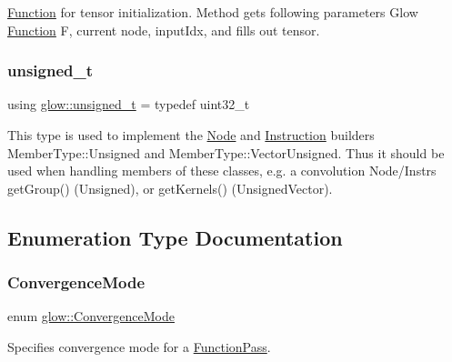 \hyperlink{classglow_1_1_function}{Function} for {\ttfamily tensor} initialization. Method gets following parameters Glow \hyperlink{classglow_1_1_function}{Function} {\ttfamily F}, current {\ttfamily node}, {\ttfamily input\+Idx}, and fills out {\ttfamily tensor}. \mbox{\label{namespaceglow_a0ca574644e1e42ef193a9947fb4d8911}} 
\subsubsection{\texorpdfstring{unsigned\+\_\+t}{unsigned\_t}}
{\footnotesize\ttfamily using \hyperlink{namespaceglow_a0ca574644e1e42ef193a9947fb4d8911}{glow\+::unsigned\+\_\+t} = typedef uint32\+\_\+t}

This type is used to implement the \hyperlink{classglow_1_1_node}{Node} and \hyperlink{classglow_1_1_instruction}{Instruction} builder\textquotesingle{}s Member\+Type\+::\+Unsigned and Member\+Type\+::\+Vector\+Unsigned. Thus it should be used when handling members of these classes, e.\+g. a convolution Node/\+Instr\textquotesingle{}s get\+Group() (Unsigned), or get\+Kernels() (Unsigned\+Vector). 

\subsection{Enumeration Type Documentation}
\mbox{\label{namespaceglow_a56845b9c860fa69d01d2084361d7c1f0}} 
\subsubsection{\texorpdfstring{Convergence\+Mode}{ConvergenceMode}}
{\footnotesize\ttfamily enum \hyperlink{namespaceglow_a56845b9c860fa69d01d2084361d7c1f0}{glow\+::\+Convergence\+Mode}\hspace{0.3cm}{\ttfamily [strong]}}



Specifies convergence mode for a \hyperlink{classglow_1_1_function_pass}{Function\+Pass}. 

